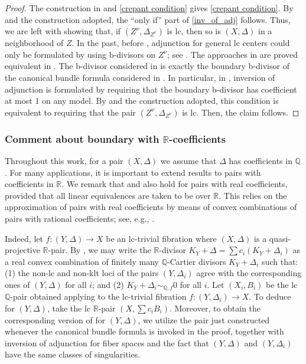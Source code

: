 \documentclass{amsart}
\theoremstyle{definition}
\theoremstyle{remark}
\def\bQ{\mathbb{Q}}
\def\bR{\mathbb{R}}
\numberwithin{equation}{section}
\begin{document}
\begin{proof}
    The construction in \cite[\S 4]{FG2012} and  \eqref{crepant condition} gives \eqref{crepant condition}.
    By  and the construction adopted, the ``only if'' part of \eqref{inv_of_adj} follows.
    Thus, we are left with showing that, if $(Z^{\nu},\Delta_{Z^{\nu}})$ is lc, then so is $(X,\Delta)$ in a neighborhood of $Z$.
   In the past, before ,
    adjunction for general lc centers could only be formulated by using b-divisors on $Z^{\nu}$; see \cite{Hac14,FH22}.  
    The approaches in \cite{Hac14,FH22} are proved equivalent in \cite{FH23}.
    The b-divisor considered in \cite{Hac14} is exactly the boundary b-divisor of the canonical bundle formula considered in \cite[\S 4]{FG2012}. In particular, in \cite{Hac14}, inversion of adjunction is formulated by requiring that the boundary b-divisor has coefficient at most 1 on any model.
    By  and the construction adopted, this 
    condition is equivalent to requiring that the pair $(Z^{\nu},\Delta_{Z^{\nu}})$ is lc.
    Then, the claim follows.
\end{proof}



\subsubsection{Comment about boundary with $\bR$-coefficients}
Throughout this work, for a pair $(X,\Delta)$ we assume that $\Delta$ has coefficients in $\mathbb{Q}$.
For many applications, it is important to extend results to pairs with coefficients in $\mathbb R$.
We remark that  and  also hold for 
pairs with real coefficients, provided that all linear equivalences are taken to be over $\mathbb R$.
This relies on the approximation of pairs with real coefficients by means of convex combinations of pairs with rational coefficients;
see, e.g., \cite{HanLiu}.

Indeed, let $f \colon (Y,\Delta) \to X$ be an lc-trivial fibration where $(X,\Delta)$ is a quasi-projective $\bR$-pair.
By \cite[Lem.~4.1]{HanLiu}, we may write the $\bR$-divisor $K_Y+\Delta = \sum c_i (K_Y+\Delta_i)$ as a real convex combination of finitely many $\bQ$-Cartier divisors $K_Y+\Delta_i$ such that: (1) the non-lc and non-klt loci of the pairs $(Y,\Delta_i)$ agree with the corresponding ones of $(Y,\Delta)$ for all $i$; and (2) $K_Y+\Delta_i \sim_{\mathbb Q,f} 0$ for all $i$. 
Let $(X_i,B_i)$ be the lc $\bQ$-pair obtained applying  to the lc-trivial fibration $f \colon (Y,\Delta_i) \to X$. To deduce  for $(Y,\Delta)$, take the lc $\bR$-pair $(X,\sum c_i B_i)$.  Moreover, to obtain the corresponding version of  for $(Y, \Delta)$, we utilize the pair just constructed whenever the canonical bundle formula is invoked in the proof, together with inversion of adjunction for fiber spaces and the fact that $(Y,\Delta)$ and $(Y,\Delta_i)$ have the same classes of singularities.
\end{document}
